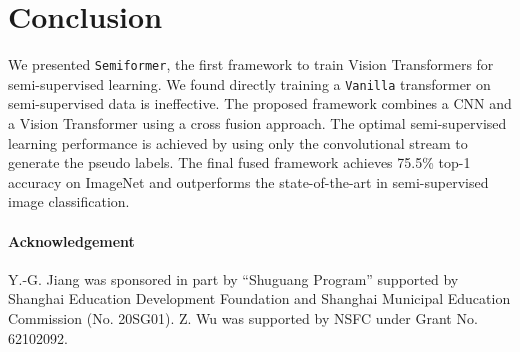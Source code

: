 \documentclass[runningheads]{llncs}
\makeatletter
\newcommand*{\system}{\texttt{Semiformer}\@\xspace}
\newcommand*{\vanilla}{\texttt{Vanilla}\@\xspace}
\makeatother
\begin{document}
\section{Conclusion}
We presented \system, the first framework to train Vision Transformers for semi-supervised learning. We found directly training a \vanilla transformer on semi-supervised data is ineffective. The proposed framework combines a CNN and a Vision Transformer using a cross fusion approach. The optimal semi-supervised learning performance is achieved by using only the convolutional stream to generate the pseudo labels. The final fused framework achieves 75.5\% top-1 accuracy on ImageNet and outperforms the state-of-the-art in semi-supervised image classification. 

\paragraph{\bf{Acknowledgement}} Y.-G. Jiang was
sponsored in part by ``Shuguang Program'' supported by Shanghai Education Development Foundation and Shanghai Municipal
Education Commission (No. 20SG01). Z. Wu was supported by NSFC under Grant No. 62102092.




\clearpage


\end{document}
